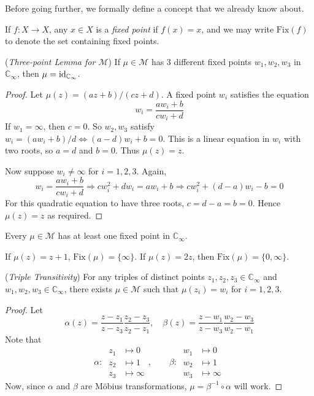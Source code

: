 \documentclass[10pt, a4paper, twoside]{report}
\begin{document}
Before going further, we formally define a concept that we already know about. 
\begin{definition}
    If \(f:X\to X\), any \(x\in X\) is a \emph{fixed point} if \(f(x)=x\), and we may write \(\mathrm{Fix}(f)\) to denote the set containing fixed points.
\end{definition}
\begin{lemma}
    (\emph{Three-point Lemma for \(\mathcal{M}\)}) If \(\mu\in\mathcal{M}\) has 3 different fixed points \(w_1,w_2,w_3\) in \(\mathbb{C}_\infty\), then \(\mu=\operatorname{id}_{\mathbb{C}_\infty}\).
    \label{lemma:3point_mobius}
\end{lemma}
\begin{proof}
    Let \(\mu(z)=(az+b)/(cz+d)\). A fixed point \(w_i\) satisfies the equation 
    \[w_i=\frac{aw_i+b}{cw_i+d}\]
    If \(w_1=\infty\), then \(c=0\). So \(w_2,w_3\) satisfy \(w_i=(aw_i+b)/d\Leftrightarrow (a-d)w_i+b=0\). This is a linear equation in \(w_i\) with two roots, so \(a=d\) and \(b=0\). Thus \(\mu(z)=z\).

    Now suppose \(w_i\neq\infty\) for \(i=1,2,3\). Again, 
    \[w_i=\frac{aw_i+b}{cw_i+d}\Rightarrow cw_i^2+dw_i=aw_i+b\Rightarrow cw_i^2+(d-a)w_i-b=0\]
    For this quadratic equation to have three roots, \(c=d-a=b=0\). Hence \(\mu(z)=z\) as required.
\end{proof}
\begin{example}
    Every \(\mu\in\mathcal{M}\) has at least one fixed point in \(\mathbb{C}_\infty\).
\end{example}
\begin{example}
    If \(\mu(z)=z+1\), \(\mathrm{Fix}(\mu)=\{\infty\}\). If \(\mu(z)=2z\), then \(\mathrm{Fix}(\mu)=\{0,\infty\}\).
\end{example}
\begin{lemma}
    (\emph{Triple Transitivity}) For any triples of distinct points \(z_1,z_2,z_3\in\mathbb{C}_\infty\) and \(w_1,w_2,w_3\in\mathbb{C}_\infty\), there exists \(\mu\in\mathcal{M}\) such that \(\mu(z_i)=w_i\) for \(i=1,2,3\).
    \label{lemma:triple_trans}
\end{lemma}
\begin{proof}
    Let 
    \[\alpha(z)=\frac{z-z_1}{z-z_3}\frac{z_2-z_3}{z_2-z_1},\quad\beta(z)=\frac{z-w_1}{z-w_3}\frac{w_2-w_3}{w_2-w_1}\]
    Note that 
    \[\alpha:\:\begin{aligned}
        z_1&\mapsto 0 \\
        z_2&\mapsto 1 \\
        z_3&\mapsto\infty
    \end{aligned},\qquad\beta:\:\begin{aligned}
        w_1&\mapsto 0 \\
        w_2&\mapsto 1 \\
        w_3&\mapsto\infty
    \end{aligned}\]
    Now, since \(\alpha\) and \(\beta\) are Möbius transformations, \(\mu=\beta^{-1}\circ\alpha\) will work.
\end{proof}
\end{document}
